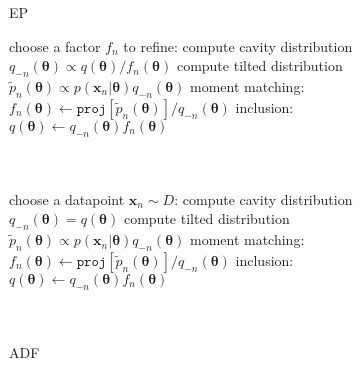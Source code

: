 \begin{figure}[!t]
\begin{minipage}[t]{0.33\linewidth}
\centering
\begin{algorithm}[H] 
\caption{EP} \small
\label{alg:ep} 
\begin{algorithmic}[1] 
	\STATE choose a factor $f_n$ to refine:
	\STATE compute cavity distribution \\$q_{-n}(\bm{\theta}) \propto q(\bm{\theta}) / f_n(\bm{\theta})$ 
	\STATE compute tilted distribution \\$\tilde{p}_n(\bm{\theta}) \propto p(\bm{x}_n|\bm{\theta}) q_{-n}(\bm{\theta})$
	\STATE moment matching: \\ \hspace{-1mm}$f_n(\bm{\theta}) \leftarrow \mathtt{proj}[\tilde{p}_n(\bm{\theta})] / q_{-n}(\bm{\theta}) $
	\STATE inclusion:\\ $q(\bm{\theta}) \leftarrow q_{-n}(\bm{\theta}) f_n(\bm{\theta})$\\\hspace{1mm}\\ \vspace{1.5mm} \hspace{1mm}\\
\end{algorithmic}
\end{algorithm}
\end{minipage}
%
\begin{minipage}[t]{0.33\linewidth}
\centering
\begin{algorithm}[H] 
\caption{ADF} \small
\label{alg:adf} 
\begin{algorithmic}[1] 
	\STATE choose a datapoint $\bm{x}_n\sim D$:
	\STATE compute cavity distribution \\$q_{-n}(\bm{\theta}) = q(\bm{\theta})$
	\STATE compute tilted distribution \\$\tilde{p}_n(\bm{\theta}) \propto p(\bm{x}_n|\bm{\theta}) q_{-n}(\bm{\theta})$
	\STATE moment matching: \\ \hspace{-1mm}$f_n(\bm{\theta}) \leftarrow \mathtt{proj}[\tilde{p}_n(\bm{\theta})] / q_{-n}(\bm{\theta}) $
	\STATE inclusion:\\ $q(\bm{\theta}) \leftarrow q_{-n}(\bm{\theta}) f_n(\bm{\theta})$\\\hspace{1mm}\\ \vspace{1.5mm} \hspace{1mm}\\

\end{algorithmic}
\end{algorithm}
\end{minipage}
\end{figure}
